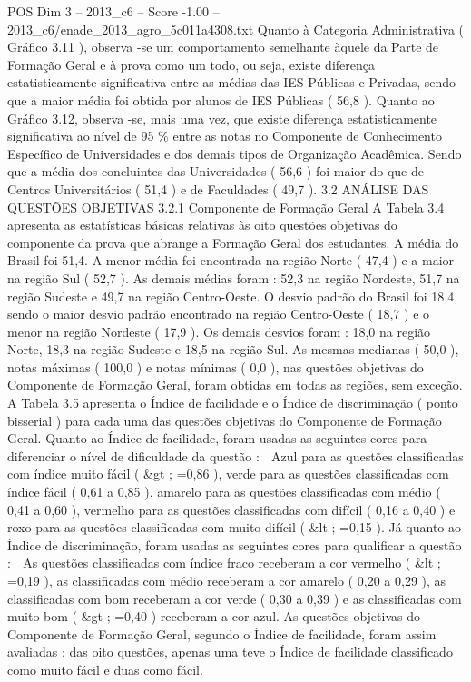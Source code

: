 \begin{textsample}{POS Dim 3 – 2013\_c6 – Score -1.00 – 2013\_c6/enade\_2013\_agro\_5c011a4308.txt}
Quanto à Categoria Administrativa ( Gráfico 3.11 ), observa -se um comportamento semelhante àquele da Parte de Formação Geral e à prova como um todo, ou seja, existe diferença estatisticamente significativa entre as médias das IES Públicas e Privadas, sendo que a maior média foi obtida por alunos de IES Públicas ( 56,8 ).
Quanto ao Gráfico 3.12, observa -se, mais uma vez, que existe diferença estatisticamente significativa ao nível de 95 \% entre as notas no Componente de Conhecimento Específico de Universidades e dos demais tipos de Organização Acadêmica.
Sendo que a média dos concluintes das Universidades ( 56,6 ) foi maior do que de Centros Universitários ( 51,4 ) e de Faculdades ( 49,7 ). 3.2 ANÁLISE DAS QUESTÕES OBJETIVAS 3.2.1 Componente de Formação Geral A Tabela 3.4 apresenta as estatísticas básicas relativas às oito questões objetivas do componente da prova que abrange a Formação Geral dos estudantes.
A média do Brasil foi 51,4.
A menor média foi encontrada na região Norte ( 47,4 ) e a maior na região Sul ( 52,7 ).
As demais médias foram : 52,3 na região Nordeste, 51,7 na região Sudeste e 49,7 na região Centro-Oeste.
O desvio padrão do Brasil foi 18,4, sendo o maior desvio padrão encontrado na região Centro-Oeste ( 18,7 ) e o menor na região Nordeste ( 17,9 ).
Os demais desvios foram : 18,0 na região Norte, 18,3 na região Sudeste e 18,5 na região Sul.
As mesmas medianas ( 50,0 ), notas máximas ( 100,0 ) e notas mínimas ( 0,0 ), nas questões objetivas do Componente de Formação Geral, foram obtidas em todas as regiões, sem exceção.
A Tabela 3.5 apresenta o Índice de facilidade e o Índice de discriminação ( ponto bisserial ) para cada uma das questões objetivas do Componente de Formação Geral.
Quanto ao Índice de facilidade, foram usadas as seguintes cores para diferenciar o nível de dificuldade da questão :  Azul para as questões classificadas com índice muito fácil ( \&gt ; =0,86 ), verde para as questões classificadas com índice fácil ( 0,61 a 0,85 ), amarelo para as questões classificadas com médio ( 0,41 a 0,60 ), vermelho para as questões classificadas com difícil ( 0,16 a 0,40 ) e roxo para as questões classificadas com muito difícil ( \&lt ; =0,15 ).
Já quanto ao Índice de discriminação, foram usadas as seguintes cores para qualificar a questão :  As questões classificadas com índice fraco receberam a cor vermelho ( \&lt ; =0,19 ), as classificadas com médio receberam a cor amarelo ( 0,20 a 0,29 ), as classificadas com bom receberam a cor verde ( 0,30 a 0,39 ) e as classificadas com muito bom ( \&gt ; =0,40 ) receberam a cor azul.
As questões objetivas do Componente de Formação Geral, segundo o Índice de facilidade, foram assim avaliadas : das oito questões, apenas uma teve o Índice de facilidade classificado como muito fácil e duas como fácil.

\end{textsample}
